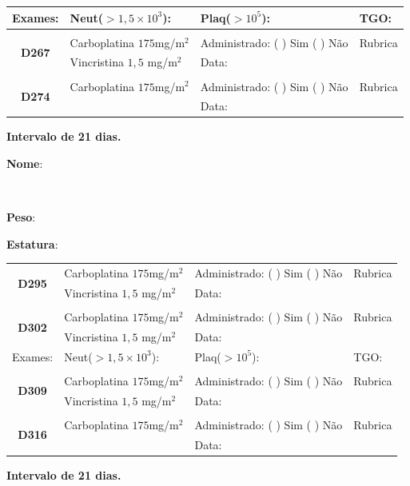 \documentclass[11pt,a4paper,oldfontcommands]{memoir}
\def\entrywithlabel[#1]#2{\parbox{#1}{{\small #2:} \hrulefill}}
\begin{document}
\begin{center}
\begin{table}[H]
\begin{tabular}{p{1.3cm}p{4.9cm}|p{4.7cm}|p{3cm}}
{Exames:}&{Neut(\(>1,5\times10^3\)):}&{Plaq(\(>10^5\)):}&{TGO:}
    \\
    \hline
    \\
    \hline
    \multicolumn{1}{c|}{\multirow{2}{*}{\textbf{D267}}}&{Carboplatina \(175\)mg/m\(^2\)}&{Administrado: (  ) Sim (  ) Não}&{Rubrica}\\
    \multicolumn{1}{c|}{}&{Vincristina \(1,5\) mg/m\(^2\)}&{Data:}&\\
    \hline
    \\
    \hline
    \multicolumn{1}{c|}{\multirow{2}{*}{\textbf{D274}}}&{Carboplatina \(175\)mg/m\(^2\)}&{Administrado: (  ) Sim (  ) Não}&{Rubrica}\\
	\multicolumn{1}{c|}{}&&{Data:}&\\
    \hline
\end{tabular}
\end{table}
\textbf{Intervalo de 21 dias.}
\pagebreak

\noindent
\entrywithlabel[1\hsize]{\textbf{Nome}}\hfill
\\[0.3cm]
\entrywithlabel[.45\hsize]{\textbf{Peso}}\hfill  \entrywithlabel[.45\hsize]{\textbf{Estatura}}


\begin{table}[H]
\begin{tabular}{p{1.3cm}p{4.9cm}|p{4.7cm}|p{3cm}}
    \hline
    \multicolumn{1}{c|}{\multirow{2}{*}{\textbf{D295}}}&{Carboplatina \(175\)mg/m\(^2\)}&{Administrado: (  ) Sim (  ) Não}&{Rubrica}\\
    \multicolumn{1}{c|}{}&{Vincristina \(1,5\) mg/m\(^2\)}&{Data:}&\\
    \hline
    \\
    \hline
    \multicolumn{1}{c|}{\multirow{2}{*}{\textbf{D302}}}&{Carboplatina \(175\)mg/m\(^2\)}&{Administrado: (  ) Sim (  ) Não}&{Rubrica}\\
    \multicolumn{1}{c|}{}&{Vincristina \(1,5\) mg/m\(^2\)}&{Data:}&\\
    \hline
{Exames:}&{Neut(\(>1,5\times10^3\)):}&{Plaq(\(>10^5\)):}&{TGO:}
    \\
    \hline
    \\
    \hline
    \multicolumn{1}{c|}{\multirow{2}{*}{\textbf{D309}}}&{Carboplatina \(175\)mg/m\(^2\)}&{Administrado: (  ) Sim (  ) Não}&{Rubrica}\\
    \multicolumn{1}{c|}{}&{Vincristina \(1,5\) mg/m\(^2\)}&{Data:}&\\
    \hline
    \\
    \hline
    \multicolumn{1}{c|}{\multirow{2}{*}{\textbf{D316}}}&{Carboplatina \(175\)mg/m\(^2\)}&{Administrado: (  ) Sim (  ) Não}&{Rubrica}\\
	\multicolumn{1}{c|}{}&&{Data:}&\\
    \hline
\end{tabular}
\end{table}
\textbf{Intervalo de 21 dias.}


\end{center}
\end{document}
